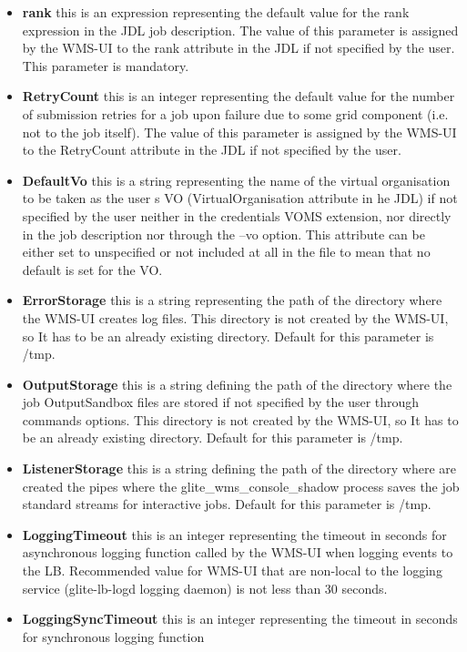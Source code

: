 \begin{itemize}
 \item \textbf{rank} this is an expression representing the default value for the rank expression in the JDL job 
   description. The value of this parameter is assigned by the WMS-UI to the rank attribute in the JDL if not 
   specified by the user. This parameter is mandatory.   
 \item \textbf{RetryCount} this is an integer representing the default value for the number of submission retries for 
   a job upon failure due to some grid component (i.e. not to the job itself). The value of this parameter 
   is assigned by the WMS-UI to the RetryCount attribute in the JDL if not specified by the user.   
 \item \textbf{DefaultVo} this is a string representing the name of the virtual organisation to be taken as the user s 
   VO (VirtualOrganisation attribute in he JDL) if not specified by the user neither in the credentials 
   VOMS extension, nor directly in the job description nor through the --vo option. This attribute can be 
   either set to  unspecified  or not included at all in the file to mean that no default is set for the VO. 
 \item \textbf{ErrorStorage} this is a string representing the path of the directory where the WMS-UI creates log files. 
   This directory is not created by the WMS-UI, so It has to be an already existing directory. Default for this 
   parameter is /tmp.   
 \item \textbf{OutputStorage} this is a string defining the path of the directory where the job OutputSandbox files are 
   stored if not specified by the user through commands options. This directory is not created by the WMS-UI, 
   so It has to be an already existing directory. Default for this parameter is /tmp. 
 \item \textbf{ListenerStorage} this is a string defining the path of the directory where are created the pipes where 
   the glite\_wms\_console\_shadow process saves the job standard streams for interactive jobs. Default for 
   this parameter is /tmp.   
 \item \textbf{LoggingTimeout} this is an integer representing the timeout in seconds for asynchronous logging function 
   called by the WMS-UI when logging events to the LB. Recommended value for WMS-UI that are non-local to the 
   logging service (glite-lb-logd logging daemon) is not less than 30 seconds. 
 \item \textbf{LoggingSyncTimeout} this is an integer representing the timeout in seconds for synchronous logging function

\end{itemize}
